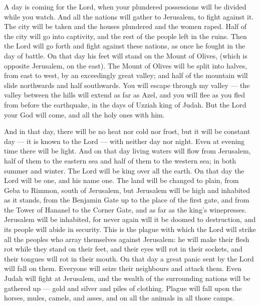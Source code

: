  A day is coming for the Lord, when your plundered
possessions will be divided while you watch.  And all the
nations will gather to Jerusalem, to fight against it. The city will be
taken and the houses plundered and the women raped. Half of the city
will go into captivity, and the rest of the people left in the ruins.
 Then the Lord will go forth and fight against these
nations, as once he fought in the day of battle.  On that
day his feet will stand on the Mount of Olives, (which is opposite
Jerusalem, on the east). The Mount of Olives will be split into halves,
from east to west, by an exceedingly great valley; and half of the
mountain will slide northwards and half southwards.  You
will escape through my valley --- the valley between the hills will
extend as far as Azel, and you will flee as you fled from before the
earthquake, in the days of Uzziah king of Judah. But the Lord your God
will come, and all the holy ones with him.

 And in that day, there will be no heat nor cold nor frost,
 but it will be constant day --- it is known to the Lord ---
with neither day nor night. Even at evening time there will be light.
 And on that day living waters will flow from Jerusalem,
half of them to the eastern sea and half of them to the western sea; in
both summer and winter.  The Lord will be king over all the
earth. On that day the Lord will be one, and his name one. 
The land will be changed to plain, from Geba to Rimmon, south of
Jerusalem, but Jerusalem will be high and inhabited as it stands, from
the Benjamin Gate up to the place of the first gate, and from the Tower
of Hananel to the Corner Gate, and as far as the king's winepresses.
 Jerusalem will be inhabited, for never again will it be
doomed to destruction, and its people will abide in security.
 This is the plague with which the Lord will strike all the
peoples who array themselves against Jerusalem: he will make their flesh
rot while they stand on their feet, and their eyes will rot in their
sockets, and their tongues will rot in their mouth.  On
that day a great panic sent by the Lord will fall on them. Everyone will
seize their neighbours and attack them.  Even Judah will
fight at Jerusalem, and the wealth of the surrounding nations will be
gathered up --- gold and silver and piles of clothing. 
Plague will fall upon the horses, mules, camels, and asses, and on all
the animals in all those camps.


